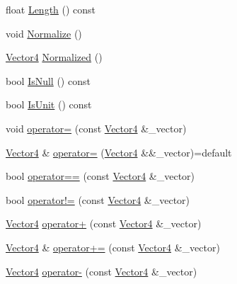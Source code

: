 \begin{DoxyCompactItemize}
\item 
float \mbox{\hyperlink{structpad_1_1math_1_1_vector4_ac374b52275efc5f8e8b988e347fc340e}{Length}} () const
\item 
void \mbox{\hyperlink{structpad_1_1math_1_1_vector4_ae79f5cf216a4270769bfb88a54d0541d}{Normalize}} ()
\item 
\mbox{\hyperlink{structpad_1_1math_1_1_vector4}{Vector4}} \mbox{\hyperlink{structpad_1_1math_1_1_vector4_a984da7891140213ff81038628beae587}{Normalized}} ()
\item 
bool \mbox{\hyperlink{structpad_1_1math_1_1_vector4_a60b73d235abc2a5948dccbe786de338f}{Is\+Null}} () const
\item 
bool \mbox{\hyperlink{structpad_1_1math_1_1_vector4_a194b228f5e0d3d8171daaa78927a7bd3}{Is\+Unit}} () const
\item 
void \mbox{\hyperlink{structpad_1_1math_1_1_vector4_ac705833566aae9930fa13586833a535b}{operator=}} (const \mbox{\hyperlink{structpad_1_1math_1_1_vector4}{Vector4}} \&\+\_\+vector)
\item 
\mbox{\hyperlink{structpad_1_1math_1_1_vector4}{Vector4}} \& \mbox{\hyperlink{structpad_1_1math_1_1_vector4_aa8541807bf5c8c3a0b5edb851feb858a}{operator=}} (\mbox{\hyperlink{structpad_1_1math_1_1_vector4}{Vector4}} \&\&\+\_\+vector)=default
\item 
bool \mbox{\hyperlink{structpad_1_1math_1_1_vector4_afe872f9553149f12674806bb6e7eb786}{operator==}} (const \mbox{\hyperlink{structpad_1_1math_1_1_vector4}{Vector4}} \&\+\_\+vector)
\item 
bool \mbox{\hyperlink{structpad_1_1math_1_1_vector4_ad8e026dad9a90b1f38211054b16ff68f}{operator!=}} (const \mbox{\hyperlink{structpad_1_1math_1_1_vector4}{Vector4}} \&\+\_\+vector)
\item 
\mbox{\hyperlink{structpad_1_1math_1_1_vector4}{Vector4}} \mbox{\hyperlink{structpad_1_1math_1_1_vector4_ac6b2370ae62f75e3dcb112427e3f518f}{operator+}} (const \mbox{\hyperlink{structpad_1_1math_1_1_vector4}{Vector4}} \&\+\_\+vector)
\item 
\mbox{\hyperlink{structpad_1_1math_1_1_vector4}{Vector4}} \& \mbox{\hyperlink{structpad_1_1math_1_1_vector4_aed8f9c0faacfe13f7985d5f4e4f73d23}{operator+=}} (const \mbox{\hyperlink{structpad_1_1math_1_1_vector4}{Vector4}} \&\+\_\+vector)
\item 
\mbox{\hyperlink{structpad_1_1math_1_1_vector4}{Vector4}} \mbox{\hyperlink{structpad_1_1math_1_1_vector4_a05cc7e4f760aae9610025584d1608b50}{operator-\/}} (const \mbox{\hyperlink{structpad_1_1math_1_1_vector4}{Vector4}} \&\+\_\+vector)

\end{DoxyCompactItemize}
